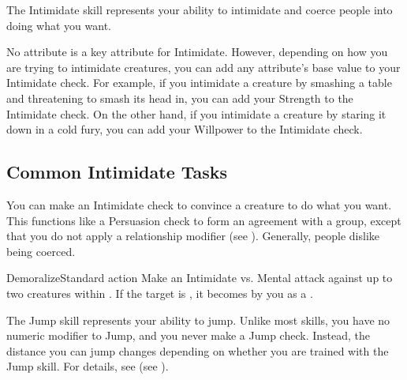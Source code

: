 \newpage
{}
  The Intimidate skill represents your ability to intimidate and coerce people into doing what you want.

  No attribute is a key attribute for Intimidate.
  However, depending on how you are trying to intimidate creatures, you can add any attribute's base value to your Intimidate check.
  For example, if you intimidate a creature by smashing a table and threatening to smash its head in, you can add your Strength to the Intimidate check.
  On the other hand, if you intimidate a creature by staring it down in a cold fury, you can add your Willpower to the Intimidate check.

  \subsection{Common Intimidate Tasks}
     You can make an Intimidate check to convince a creature to do what you want. This functions like a Persuasion check to form an agreement with a group, except that you do not apply a relationship modifier (see ).
    Generally, people dislike being coerced.

    \begin{activeability}{Demoralize}{Standard action}
      \rankline
      Make an Intimidate vs. Mental attack against up to two creatures within \shortrange.
      \hit If the target is , it becomes \frightened by you as a .
    \end{activeability}

\newpage
{}
  The Jump skill represents your ability to jump.
  Unlike most skills, you have no numeric modifier to Jump, and you never make a Jump check.
  Instead, the distance you can jump changes depending on whether you are trained with the Jump skill.
  For details, see (see ).

